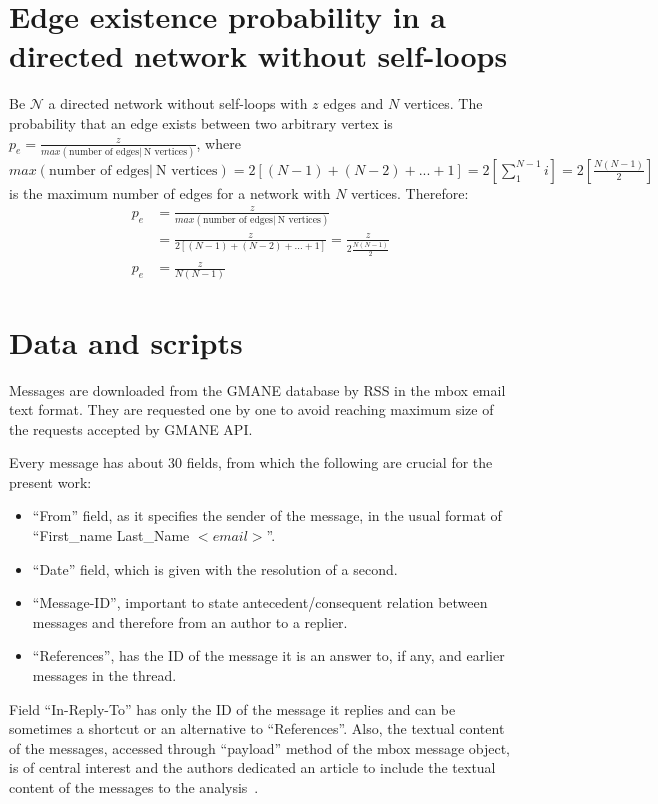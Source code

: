 \documentclass[%
 aip,
 jmp,%
 amsmath,amssymb,
 reprint,%
]{revtex4-1}
\begin{document}
\appendix
\section{Edge existence probability in a directed network without self-loops}\label{ap:ded}
Be $\mathcal{N}$ a directed network without self-loops with $z$ edges and $N$ vertices. The probability that an edge exists between two arbitrary vertex is $p_e=\frac{z}{max( \text{number of edges} |\ \text{N vertices})}$, where $max( \text{number of edges} |\ \text{N vertices})=2[(N-1)+(N-2)+...+1]=2[\sum_1^{N-1}i]=2[\frac{N(N-1)}{2}]$ is the maximum number of edges for a network with $N$ vertices. Therefore:
\begin{align}
    p_e&=\frac{z}{max( \text{number of edges} |\ \text{N vertices})} \nonumber \\
       &=\frac{z}{2[(N-1)+(N-2)+...+1]}=\frac{z}{2\frac{N(N-1)}{2}} \nonumber \\
   p_e &=\frac{z}{N(N-1)}
\end{align}

\section{Data and scripts}\label{scripts}
Messages are downloaded from the GMANE database by RSS in the mbox email text format. 
They are requested one by one to avoid reaching maximum size of the requests accepted by
GMANE API.

Every message has about 30 fields, from which the following are crucial
for the present work:
\begin{itemize}
    \item ``From'' field, as it specifies the sender of the message, in the usual format of ``First\_name Last\_Name $<email>$''.
    \item ``Date'' field, which is given with the resolution of a second.
    \item ``Message-ID'', important to state antecedent/consequent relation between messages and therefore from an author to a replier.
    \item ``References'', has the ID of the message it is an answer to, if any, and earlier messages in the thread.
\end{itemize}

Field ``In-Reply-To'' has only the ID of the message it replies and can be sometimes
a shortcut or an alternative to ``References''. Also, the textual content of the messages,
accessed through ``payload'' method of the mbox message object, is of central interest and
the authors dedicated an article to include the textual content of the messages to the analysis~\cite{rcText}.
\end{document}
